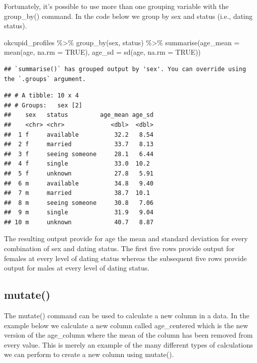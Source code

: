 \documentclass[
]{krantz}
\makeatletter
\newenvironment{Shaded}{\begin{snugshade}}{\end{snugshade}}
\newcommand{\AttributeTok}[1]{\textcolor[rgb]{0.61,0.61,0.61}{#1}}
\newcommand{\ConstantTok}[1]{\textcolor[rgb]{0,0,0}{#1}}
\newcommand{\FunctionTok}[1]{\textcolor[rgb]{0,0,0}{#1}}
\newcommand{\NormalTok}[1]{#1}
\newcommand{\SpecialCharTok}[1]{\textcolor[rgb]{0,0,0}{#1}}
\newenvironment{kframe}{%
\medskip{}
\setlength{\fboxsep}{.8em}
 \def\at@end@of@kframe{}%
 \ifinner\ifhmode%
  \def\at@end@of@kframe{\end{minipage}}%
  \begin{minipage}{\columnwidth}%
 \fi\fi%
 \def\FrameCommand##1{\hskip\@totalleftmargin \hskip-\fboxsep
 \colorbox{shadecolor}{##1}\hskip-\fboxsep
     \hskip-\linewidth \hskip-\@totalleftmargin \hskip\columnwidth}%
 \MakeFramed {\advance\hsize-\width
   \@totalleftmargin\z@ \linewidth\hsize
   \@setminipage}}%
 {\par\unskip\endMakeFramed%
 \at@end@of@kframe}
\renewenvironment{Shaded}{\begin{kframe}}{\end{kframe}}
\makeatother
\begin{document}
Fortunately, it's possible to use more than one grouping variable with the group\_by() command. In the code below we group by sex and status (i.e., dating status).

\begin{Shaded}
\begin{Highlighting}[]
\NormalTok{okcupid\_profiles }\SpecialCharTok{\%\textgreater{}\%}
  \FunctionTok{group\_by}\NormalTok{(sex, status) }\SpecialCharTok{\%\textgreater{}\%}
  \FunctionTok{summarise}\NormalTok{(}\AttributeTok{age\_mean =} \FunctionTok{mean}\NormalTok{(age, }\AttributeTok{na.rm =} \ConstantTok{TRUE}\NormalTok{),}
            \AttributeTok{age\_sd =} \FunctionTok{sd}\NormalTok{(age, }\AttributeTok{na.rm =} \ConstantTok{TRUE}\NormalTok{)) }
\end{Highlighting}
\end{Shaded}

\begin{verbatim}
## `summarise()` has grouped output by 'sex'. You can override using the `.groups` argument.
\end{verbatim}

\begin{verbatim}
## # A tibble: 10 x 4
## # Groups:   sex [2]
##    sex   status         age_mean age_sd
##    <chr> <chr>             <dbl>  <dbl>
##  1 f     available          32.2   8.54
##  2 f     married            33.7   8.13
##  3 f     seeing someone     28.1   6.44
##  4 f     single             33.0  10.2 
##  5 f     unknown            27.8   5.91
##  6 m     available          34.8   9.40
##  7 m     married            38.7  10.1 
##  8 m     seeing someone     30.8   7.06
##  9 m     single             31.9   9.04
## 10 m     unknown            40.7   8.87
\end{verbatim}

The resulting output provide for age the mean and standard deviation for every combination of sex and dating status. The first five rows provide output for females at every level of dating status whereas the subsequent five rows provide output for males at every level of dating status.

\hypertarget{mutate}{%
\subsection{mutate()}\label{mutate}}

The mutate() command can be used to calculate a new column in a data. In the example below we calculate a new column called age\_centered which is the new version of the age\_column where the mean of the column has been removed from every value. This is merely an example of the many different types of calculations we can perform to create a new column using mutate().
\end{document}
